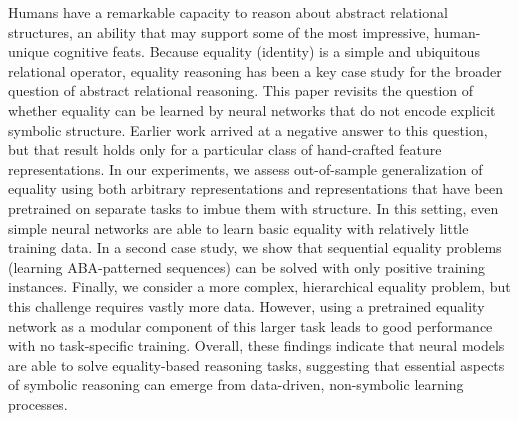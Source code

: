 Humans have a remarkable capacity to reason about abstract relational structures, an ability that may support some of the most impressive, human-unique cognitive feats. Because equality (identity) is a simple and ubiquitous relational operator, equality reasoning has been a key case study for the broader question of abstract relational reasoning. This paper revisits the question of whether equality can be learned by neural networks that do not encode explicit symbolic structure. Earlier work arrived at a negative answer to this question, but that result holds only for a particular class of hand-crafted feature representations. In our experiments, we assess out-of-sample generalization of equality using both arbitrary representations and representations that have been pretrained on separate tasks to imbue them with  structure. In this setting, even simple neural networks are able to learn basic equality with relatively little training data. In a second case study, we show that sequential equality problems (learning ABA-patterned sequences) can be solved with only positive training instances. Finally, we consider a more complex, hierarchical equality problem, but this challenge requires vastly more data. However, using a pretrained equality network as a modular component of this larger task leads to good performance with no task-specific training. Overall, these findings indicate that neural models are able to solve equality-based reasoning tasks, suggesting that essential aspects of symbolic reasoning can emerge from data-driven, non-symbolic learning processes.
